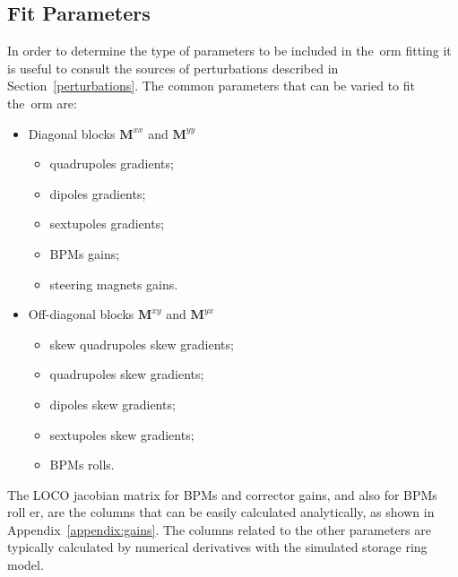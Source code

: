 \subsection{Fit Parameters}\label{subsec:fit_params}
In order to determine the type of parameters to be included in the~\gls{orm} fitting it is useful to consult the sources of perturbations described in Section~\ref{perturbations}. The common parameters that can be varied to fit the~\gls{orm} are:
\begin{itemize}
    \item Diagonal blocks $\mathbf{M}^{xx}$ and $\mathbf{M}^{yy}$
    \begin{itemize}
        \item quadrupoles gradients;
        \item dipoles gradients;
        \item sextupoles gradients;
        \item BPMs gains;
        \item steering magnets gains.
    \end{itemize}
    \item Off-diagonal blocks $\mathbf{M}^{xy}$ and $\mathbf{M}^{yx}$
    \begin{itemize}
        \item skew quadrupoles skew gradients;
        \item quadrupoles skew gradients;
        \item dipoles skew gradients;
        \item sextupoles skew gradients;
        \item BPMs rolls.
    \end{itemize}
\end{itemize}
The LOCO jacobian matrix for BPMs and corrector gains, and also for BPMs roll er, are the columns that can be easily calculated analytically, as shown in Appendix~\ref{appendix:gains}. The columns related to the other parameters are typically calculated by numerical derivatives with the simulated storage ring model. 

